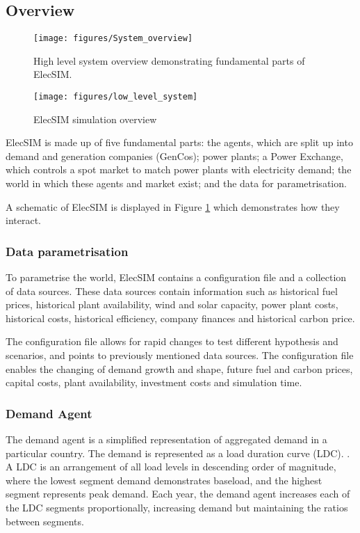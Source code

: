 


\subsection{Overview}

\begin{figure}
	\centering
	\texttt{[image: figures/System\_overview]}
	\caption{High level system overview demonstrating fundamental parts of ElecSIM.}
	\label{fig:systemoverview}
\end{figure}

\begin{figure*}
	\centering
	\texttt{[image: figures/low\_level\_system]}
	\caption{ElecSIM simulation overview}
	\label{fig:lowlevelsystem}
\end{figure*}

ElecSIM is made up of five fundamental parts: the agents, which are split up into demand and generation companies (GenCos); power plants; a Power Exchange, which controls a spot market to match power plants with electricity demand; the world in which these agents and market exist; and the data for parametrisation.

A schematic of ElecSIM is displayed in Figure \ref{fig:systemoverview} which demonstrates how they interact.

\subsubsection{Data parametrisation} To parametrise the world, ElecSIM contains a configuration file and a collection of data sources. These data sources contain information such as historical fuel prices, historical plant availability, wind and solar capacity, power plant costs, historical costs, historical efficiency, company finances and historical carbon price. 

The configuration file allows for rapid changes to test different hypothesis and scenarios, and points to previously mentioned data sources. The configuration file enables the changing of demand growth and shape, future fuel and carbon prices, capital costs, plant availability, investment costs and simulation time.

\subsubsection{Demand Agent}
The demand agent is a simplified representation of aggregated demand in a particular country. The demand is represented as a load duration curve (LDC). . A LDC is an arrangement of all load levels in descending order of magnitude, where the lowest segment demand demonstrates baseload, and the highest segment represents peak demand. Each year, the demand agent increases each of the LDC segments proportionally, increasing demand but maintaining the ratios between segments.

